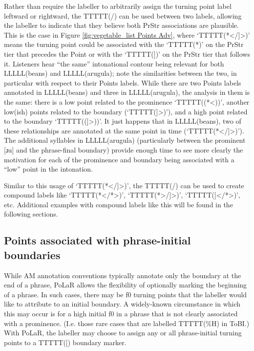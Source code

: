\documentclass[11pt, twoside]{memoir}
\begin{document}
Rather than require the labeller to arbitrarily assign the turning point label leftward or rightward, the TTTTT(/) can be used between two labels, allowing the labeller to indicate that they believe both PrStr associations are plausible. This is the case in Figure \ref{fig:vegetable_list Points Adv}, where ‘TTTTT(*</]>)’ means the turning point could be associated with the ‘TTTTT(*)’ on the PrStr tier that precedes the Point or with the ‘TTTTT(])’ on the PrStr tier that follows it. Listeners hear “the same” intonational contour being relevant for both LLLLL(beans) and LLLLL(arugula); note the similarities between the two, in particular with respect to their Points labels. While there are two Points labels annotated in LLLLL(beans) and three in LLLLL(arugula), the analysis in them is the same: there is a low point related to the prominence ‘TTTTT((*<))’, another low(ish) points related to the boundary (‘TTTTT(]>)’), and a high point related to the boundary ‘TTTTT((]>))’. It just happens that in LLLLL(beans), two of these relationships are annotated at the same point in time (‘TTTTT(*</]>)’). The additional syllables in LLLLL(arugula) (particularly between the prominent [ɹu] and the phrase-final boundary) provide enough time to see more clearly the motivation for each of the prominence and boundary being associated with a “low” point in the intonation.

Similar to this usage of ‘TTTTT(*</]>)’, the TTTTT(/) can be used to create compound labels like ‘TTTTT(*</*>)’, ‘TTTTT(*>/]>)’, ‘TTTTT(]</*>)’, etc. Additional examples with compound labels like this will be found in the following sections.

\subsection{Points associated with phrase-initial boundaries}\label{sec:points-associated-with-phrase-initial-boundaries}
While AM annotation conventions typically annotate only the boundary at the end of a phrase, PoLaR allows the flexibility of optionally marking the beginning of a phrase. In such cases, there may be f0 turning points that the labeller would like to attribute to an initial boundary. A widely-known circumstance in which this may occur is for a high initial f0 in a phrase that is not clearly associated with a prominence. (I.e. those rare cases that are labelled TTTTT(\%H) in ToBI.) With PoLaR, the labeller may choose to assign any or all phrase-initial turning points to a TTTTT([) boundary marker.
\end{document}
